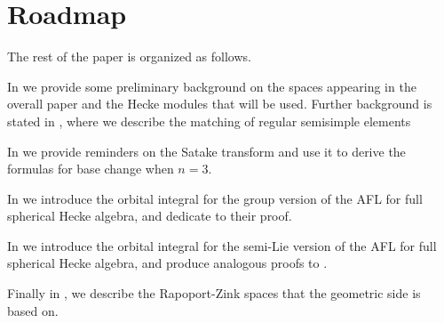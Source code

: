 \begin{theorem}
\end{theorem}

\section{Roadmap}
The rest of the paper is organized as follows.
\begin{itemize}
  \ii In  we provide some preliminary background
  on the spaces appearing in the overall paper and the Hecke modules that will be used.
  Further background is stated in ,
  where we describe the matching of regular semisimple elements

  \ii In  we provide reminders on the Satake transform
  and use it to derive the formulas for base change when $n = 3$.

  \ii In  we introduce the orbital integral
  for the group version of the AFL for full spherical Hecke algebra,
  and dedicate  to their proof.

  \ii In  we introduce the orbital integral
  for the semi-Lie version of the AFL for full spherical Hecke algebra,
  and produce analogous proofs to .

  \ii Finally in , we describe the Rapoport-Zink spaces
  that the geometric side is based on.
\end{itemize}
